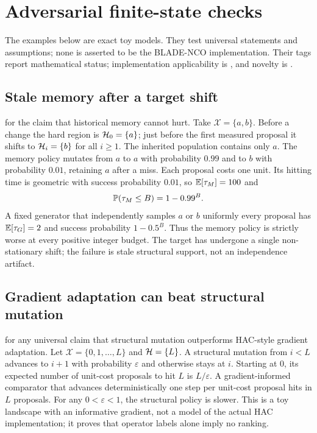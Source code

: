 \section{Adversarial finite-state checks}
The examples below are exact toy models. They test universal statements and
assumptions; none is asserted to be the BLADE-NCO implementation.
Their tags report mathematical status; implementation applicability is
, and novelty is
.

\subsection{Stale memory after a target shift}
\label{sec:counterexamples}
 for the claim that historical memory cannot hurt.
Take $\mathcal{X}=\{a,b\}$. Before a change the hard region is
$\mathcal{H}_0=\{a\}$; just before the first measured proposal it shifts to
$\mathcal{H}_i=\{b\}$ for all $i\geq1$. The inherited population contains only
$a$. The memory policy mutates from $a$ to $a$ with probability $0.99$ and to
$b$ with probability $0.01$, retaining $a$ after a miss. Each proposal costs
one unit. Its hitting time is geometric with success probability $0.01$,
so $\mathbb{E}[\tau_M]=100$ and
\[
 \mathbb{P}(\tau_M\leq B)=1-0.99^B.
\]
A fixed generator that independently samples $a$ or $b$ uniformly every
proposal has $\mathbb{E}[\tau_G]=2$ and success probability $1-0.5^B$. Thus the
memory policy is strictly worse at every positive integer budget. The target
has undergone a single non-stationary shift; the failure is stale structural
support, not an independence artifact.

\subsection{Gradient adaptation can beat structural mutation}
 for any universal claim that structural mutation
outperforms HAC-style gradient adaptation. Let
$\mathcal{X}=\{0,1,\ldots,L\}$ and $\mathcal{H}=\{L\}$. A structural mutation
from $i<L$ advances to $i+1$ with probability $\varepsilon$ and otherwise
stays at $i$. Starting at $0$, its expected number of unit-cost proposals to
hit $L$ is $L/\varepsilon$. A gradient-informed comparator that advances
deterministically one step per unit-cost proposal hits in $L$ proposals.
For any $0<\varepsilon<1$, the structural policy is slower. This is a toy
landscape with an informative gradient, not a model of the actual HAC
implementation; it proves that operator labels alone imply no ranking.

